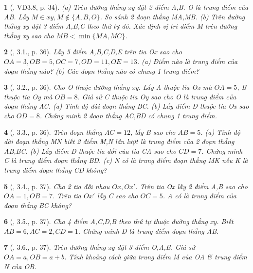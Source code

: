 \documentclass{article}
\newtheorem{baitoan}{}
\begin{document}
\begin{baitoan}[\cite{TLCT_THCS_Toan_6_hinh_hoc}, VD3.8, p. 34]
	(a) Trên đường thẳng xy đặt 2 điểm A,B. O là trung điểm của AB. Lấy $M\in xy,M\notin\{A,B,O\}$. So sánh 2 đoạn thẳng MA,MB. (b) Trên đường thẳng xy đặt 3 điểm A,B,C theo thứ tự đó. Xác định vị trí điểm M trên đường thẳng xy sao cho $MB < \min\{MA,MC\}$.
\end{baitoan}

\begin{baitoan}[\cite{TLCT_THCS_Toan_6_hinh_hoc}, 3.1., p. 36]
	Lấy 5 điểm A,B,C,D,E trên tia Ox sao cho $OA = 3,OB = 5,OC = 7,OD = 11,OE = 13$. (a) Điểm nào là trung điểm của đoạn thẳng nào? (b) Các đoạn thẳng nào có chung 1 trung điểm?
\end{baitoan}

\begin{baitoan}[\cite{TLCT_THCS_Toan_6_hinh_hoc}, 3.2., p. 36]
	Cho O thuộc đường thẳng xy. Lấy A thuộc tia Ox mà $OA = 5$, B thuộc tia Oy mà $OB = 8$. Giả sử C thuộc tia Oy sao cho O là trung điểm của đoạn thẳng AC. (a) Tính độ dài đoạn thẳng BC. (b) Lấy điểm D thuộc tia Ox sao cho $OD = 8$. Chứng minh 2 đoạn thẳng AC,BD có chung 1 trung điểm.
\end{baitoan}

\begin{baitoan}[\cite{TLCT_THCS_Toan_6_hinh_hoc}, 3.3., p. 36]
	Trên đoạn thẳng $AC = 12$, lấy B sao cho $AB = 5$. (a) Tính độ dài đoạn thẳng MN biết 2 điểm M,N lần lượt là trung điểm của 2 đoạn thẳng AB,BC. (b) Lấy điểm D thuộc tia đối của tia CA sao cho $CD = 7$. Chứng minh C là trung điểm đoạn thẳng BD. (c) N có là trung điểm đoạn thẳng MK nếu K là trung điểm đoạn thẳng CD không?
\end{baitoan}

\begin{baitoan}[\cite{TLCT_THCS_Toan_6_hinh_hoc}, 3.4., p. 37]
	Cho 2 tia đối nhau $Ox,Ox'$. Trên tia Ox lấy 2 điểm A,B sao cho $OA = 1,OB = 7$. Trên tia $Ox'$ lấy C sao cho $OC = 5$. A có là trung điểm của đoạn thẳng BC không?
\end{baitoan}

\begin{baitoan}[\cite{TLCT_THCS_Toan_6_hinh_hoc}, 3.5., p. 37]
	Cho 4 điểm A,C,D,B theo thứ tự thuộc đường thẳng xy. Biết $AB = 6,AC = 2,CD = 1$. Chứng minh D là trung điểm đoạn thẳng AB.
\end{baitoan}

\begin{baitoan}[\cite{TLCT_THCS_Toan_6_hinh_hoc}, 3.6., p. 37]
	Trên đường thẳng xy đặt 3 điểm O,A,B. Giả sử $OA = a,OB = a + b$. Tính khoảng cách giữa trung điểm M của OA \& trung điểm N của OB.
\end{baitoan}
\end{document}
